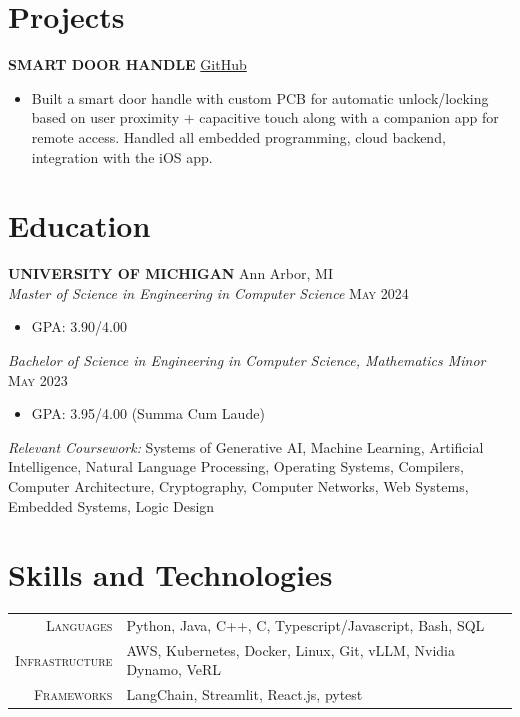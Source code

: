 \documentclass[10pt]{article}
\begin{document}
\section{Projects}

\textbf{SMART DOOR HANDLE} \hfill \href{https://github.com/ajsinger1/eecs473-smart-door}{GitHub}
\begin{itemize}[leftmargin=*, nosep, topsep=2pt, parsep=1pt]
  \item Built a smart door handle with custom PCB for automatic unlock/locking based on user proximity + capacitive touch along with a companion app for remote access. Handled all embedded programming, cloud backend, integration with the iOS app.
\end{itemize}

\section{Education}

\textbf{UNIVERSITY OF MICHIGAN} \hfill Ann Arbor, MI\\[1pt]
\textit{Master of Science in Engineering in Computer Science} \hfill \textsc{May 2024}
\begin{itemize}[leftmargin=*, nosep, topsep=2pt, parsep=1pt]
  \item GPA: 3.90/4.00
\end{itemize}

\vspace{1pt}
\textit{Bachelor of Science in Engineering in Computer Science, Mathematics Minor} \hfill \textsc{May 2023}
\begin{itemize}[leftmargin=*, nosep, topsep=2pt, parsep=1pt]
  \item GPA: 3.95/4.00 (Summa Cum Laude)
\end{itemize}

\vspace{1pt}
\textit{Relevant Coursework:} Systems of Generative AI, Machine Learning, Artificial Intelligence, Natural Language Processing, Operating Systems, Compilers, Computer Architecture, Cryptography, Computer Networks, Web Systems, Embedded Systems, Logic Design

\section{Skills and Technologies}

\begin{tabular}{r l}
\textsc{Languages} & Python, Java, C++, C, Typescript/Javascript, Bash, SQL\\
\textsc{Infrastructure} & AWS, Kubernetes, Docker, Linux, Git, vLLM, Nvidia Dynamo, VeRL\\
\textsc{Frameworks} & LangChain, Streamlit, React.js, pytest\\
\end{tabular}
\end{document}
